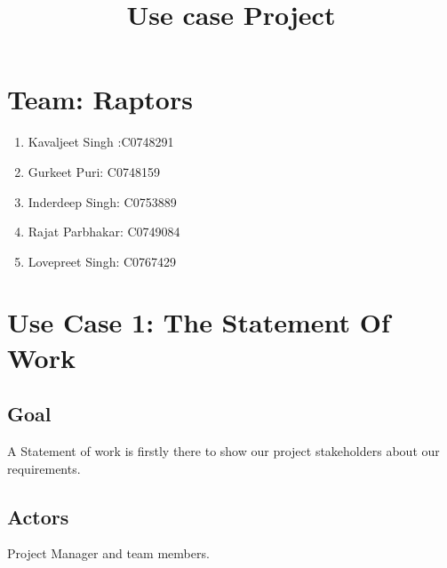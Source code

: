 \documentclass[10pt]{article}
\title{ Use case Project}
\begin{document}
\maketitle
\tableofcontents

\section{Team: Raptors}
\begin{enumerate}
\item Kavaljeet Singh :C0748291
\item Gurkeet Puri: C0748159
\item Inderdeep Singh: C0753889
\item Rajat Parbhakar: C0749084
\item Lovepreet Singh: C0767429
\end{enumerate}

\section{Use Case 1: The Statement Of Work}
\subsection{Goal}
A Statement of work is firstly there to show our project stakeholders about our requirements.
\subsection{Actors}
Project Manager and team members.
\end{document}
